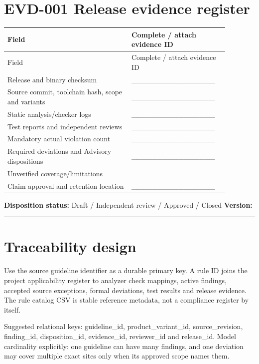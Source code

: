\documentclass[10pt,letterpaper]{article}
\begin{document}
\section{EVD-001 Release evidence register}
\small\setlength{\tabcolsep}{3pt}\renewcommand{\arraystretch}{1.15}
\begin{longtable}{p{0.52\linewidth}p{0.36\linewidth}}
\toprule
Field & Complete / attach evidence ID\\ \midrule
\endfirsthead
\toprule
Field & Complete / attach evidence ID\\ \midrule
\endhead
Release and binary checksum & \_\_\_\_\_\_\_\_\_\_\_\_\_\_\_\_\\
Source commit, toolchain hash, scope and variants & \_\_\_\_\_\_\_\_\_\_\_\_\_\_\_\_\\
Static analysis/checker logs & \_\_\_\_\_\_\_\_\_\_\_\_\_\_\_\_\\
Test reports and independent reviews & \_\_\_\_\_\_\_\_\_\_\_\_\_\_\_\_\\
Mandatory actual violation count & \_\_\_\_\_\_\_\_\_\_\_\_\_\_\_\_\\
Required deviations and Advisory dispositions & \_\_\_\_\_\_\_\_\_\_\_\_\_\_\_\_\\
Unverified coverage/limitations & \_\_\_\_\_\_\_\_\_\_\_\_\_\_\_\_\\
Claim approval and retention location & \_\_\_\_\_\_\_\_\_\_\_\_\_\_\_\_\\
\bottomrule
\end{longtable}
\normalsize
\textbf{Disposition status:} Draft / Independent review / Approved / Closed \quad \textbf{Version:} \rule{1.4cm}{0.4pt}

\section{Traceability design}
Use the source guideline identifier as a durable primary key. A rule ID joins the project applicability register to analyzer check mappings, active findings, accepted source exceptions, formal deviations, test results and release evidence. The rule catalog CSV is stable reference metadata, not a compliance register by itself.

Suggested relational keys: guideline\_id, product\_variant\_id, source\_revision, finding\_id, disposition\_id, evidence\_id, reviewer\_id and release\_id. Model cardinality explicitly: one guideline can have many findings, and one deviation may cover multiple exact sites only when its approved scope names them.
\end{document}
